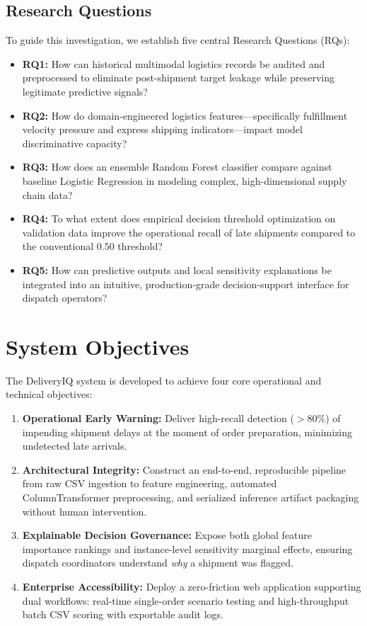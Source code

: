 \documentclass[journal,10pt,twocolumn]{IEEEtran}
\begin{document}
\subsection{Research Questions}
To guide this investigation, we establish five central Research Questions (RQs):
\begin{itemize}
    \item \textbf{RQ1:} How can historical multimodal logistics records be audited and preprocessed to eliminate post-shipment target leakage while preserving legitimate predictive signals?
    \item \textbf{RQ2:} How do domain-engineered logistics features---specifically fulfillment velocity pressure and express shipping indicators---impact model discriminative capacity?
    \item \textbf{RQ3:} How does an ensemble Random Forest classifier compare against baseline Logistic Regression in modeling complex, high-dimensional supply chain data?
    \item \textbf{RQ4:} To what extent does empirical decision threshold optimization on validation data improve the operational recall of late shipments compared to the conventional $0.50$ threshold?
    \item \textbf{RQ5:} How can predictive outputs and local sensitivity explanations be integrated into an intuitive, production-grade decision-support interface for dispatch operators?
\end{itemize}

\section{System Objectives}
\label{sec:objectives}

The DeliveryIQ system is developed to achieve four core operational and technical objectives:
\begin{enumerate}
    \item \textbf{Operational Early Warning:} Deliver high-recall detection ($>80\%$) of impending shipment delays at the moment of order preparation, minimizing undetected late arrivals.
    \item \textbf{Architectural Integrity:} Construct an end-to-end, reproducible pipeline from raw CSV ingestion to feature engineering, automated ColumnTransformer preprocessing, and serialized inference artifact packaging without human intervention.
    \item \textbf{Explainable Decision Governance:} Expose both global feature importance rankings and instance-level sensitivity marginal effects, ensuring dispatch coordinators understand \emph{why} a shipment was flagged.
    \item \textbf{Enterprise Accessibility:} Deploy a zero-friction web application supporting dual workflows: real-time single-order scenario testing and high-throughput batch CSV scoring with exportable audit logs.
\end{enumerate}
\end{document}
